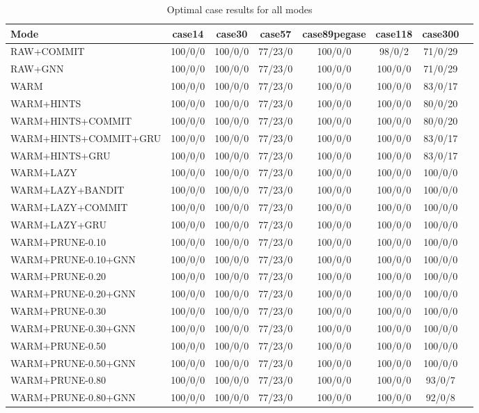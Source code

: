 \documentclass{ieeeaccess}
\begin{document}
\begin{table}\centering
\caption{Optimal case results for all modes}
\label{tab:optimal_cases}
\renewcommand{\arraystretch}{1.2}
\footnotesize
\begin{tabular}{|l||c|c|c|c|c|c|c|}\hline\textbf{Mode} & \textbf{case14} & \textbf{case30} & \textbf{case57} & \textbf{case89pegase} & \textbf{case118} & \textbf{case300} \\ \hline \hline
RAW+COMMIT & 100/0/0 & 100/0/0 & 77/23/0 & 100/0/0 & 98/0/2 & 71/0/29 \\ \hline
RAW+GNN & 100/0/0 & 100/0/0 & 77/23/0 & 100/0/0 & 100/0/0 & 71/0/29 \\ \hline
WARM & 100/0/0 & 100/0/0 & 77/23/0 & 100/0/0 & 100/0/0 & 83/0/17 \\ \hline
WARM+HINTS & 100/0/0 & 100/0/0 & 77/23/0 & 100/0/0 & 100/0/0 & 80/0/20 \\ \hline
WARM+HINTS+COMMIT & 100/0/0 & 100/0/0 & 77/23/0 & 100/0/0 & 100/0/0 & 80/0/20 \\ \hline
WARM+HINTS+COMMIT+GRU & 100/0/0 & 100/0/0 & 77/23/0 & 100/0/0 & 100/0/0 & 83/0/17 \\ \hline
WARM+HINTS+GRU & 100/0/0 & 100/0/0 & 77/23/0 & 100/0/0 & 100/0/0 & 83/0/17 \\ \hline
WARM+LAZY & 100/0/0 & 100/0/0 & 77/23/0 & 100/0/0 & 100/0/0 & 100/0/0 \\ \hline
WARM+LAZY+BANDIT & 100/0/0 & 100/0/0 & 77/23/0 & 100/0/0 & 100/0/0 & 100/0/0 \\ \hline
WARM+LAZY+COMMIT & 100/0/0 & 100/0/0 & 77/23/0 & 100/0/0 & 100/0/0 & 100/0/0 \\ \hline
WARM+LAZY+GRU & 100/0/0 & 100/0/0 & 77/23/0 & 100/0/0 & 100/0/0 & 100/0/0 \\ \hline
WARM+PRUNE-0.10 & 100/0/0 & 100/0/0 & 77/23/0 & 100/0/0 & 100/0/0 & 100/0/0 \\ \hline
WARM+PRUNE-0.10+GNN & 100/0/0 & 100/0/0 & 77/23/0 & 100/0/0 & 100/0/0 & 100/0/0 \\ \hline
WARM+PRUNE-0.20 & 100/0/0 & 100/0/0 & 77/23/0 & 100/0/0 & 100/0/0 & 100/0/0 \\ \hline
WARM+PRUNE-0.20+GNN & 100/0/0 & 100/0/0 & 77/23/0 & 100/0/0 & 100/0/0 & 100/0/0 \\ \hline
WARM+PRUNE-0.30 & 100/0/0 & 100/0/0 & 77/23/0 & 100/0/0 & 100/0/0 & 100/0/0 \\ \hline
WARM+PRUNE-0.30+GNN & 100/0/0 & 100/0/0 & 77/23/0 & 100/0/0 & 100/0/0 & 100/0/0 \\ \hline
WARM+PRUNE-0.50 & 100/0/0 & 100/0/0 & 77/23/0 & 100/0/0 & 100/0/0 & 100/0/0 \\ \hline
WARM+PRUNE-0.50+GNN & 100/0/0 & 100/0/0 & 77/23/0 & 100/0/0 & 100/0/0 & 100/0/0 \\ \hline
WARM+PRUNE-0.80 & 100/0/0 & 100/0/0 & 77/23/0 & 100/0/0 & 100/0/0 & 93/0/7 \\ \hline
WARM+PRUNE-0.80+GNN & 100/0/0 & 100/0/0 & 77/23/0 & 100/0/0 & 100/0/0 & 92/0/8 \\ \hline
\end{tabular}
\end{table}
\end{document}
